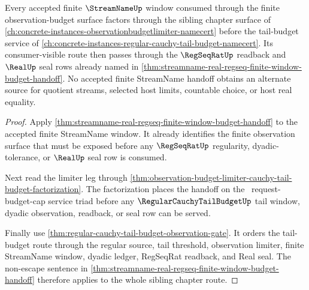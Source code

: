 \begin{theorem}
\label{thm:streamname-budget-handoff-sibling-chapter-route}
Every accepted finite $\StreamNameUp$ window consumed through the finite
observation-budget surface factors through the sibling chapter surface of
\autoref{ch:concrete-instances-observationbudgetlimiter-namecert} before the
tail-budget service of
\autoref{ch:concrete-instances-regular-cauchy-tail-budget-namecert}. Its
consumer-visible route then passes through the $\RegSeqRatUp$ readback and
$\RealUp$ seal rows already named in
\autoref{thm:streamname-real-regseq-finite-window-budget-handoff}. No accepted
finite StreamName handoff obtains an alternate source for quotient streams,
selected host limits, countable choice, or host real equality.
\end{theorem}
\begin{proof}
Apply \autoref{thm:streamname-real-regseq-finite-window-budget-handoff} to the
accepted finite StreamName window. It already identifies the finite observation
surface that must be exposed before any $\RegSeqRatUp$ regularity,
dyadic-tolerance, or $\RealUp$ seal row is consumed.

Next read the limiter leg through
\autoref{thm:observation-budget-limiter-cauchy-tail-budget-factorization}. The
factorization places the handoff on the
\ObservationBudgetLimiterUp\ request-budget-cap service triad before any
$\RegularCauchyTailBudgetUp$ tail window, dyadic observation, readback, or seal
row can be served.

Finally use \autoref{thm:regular-cauchy-tail-budget-observation-gate}. It orders
the tail-budget route through the regular source, tail threshold, observation
limiter, finite StreamName window, dyadic ledger, RegSeqRat readback, and Real
seal. The non-escape sentence in
\autoref{thm:streamname-real-regseq-finite-window-budget-handoff} therefore
applies to the whole sibling chapter route.
\end{proof}

